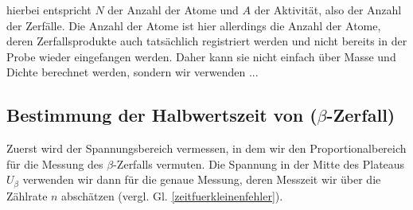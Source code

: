 hierbei entspricht $N$ der Anzahl der Atome und $A$ der Aktivität, also der Anzahl der Zerfälle. Die Anzahl der Atome ist hier allerdings die Anzahl der Atome, deren Zerfallsprodukte auch tatsächlich registriert werden und nicht bereits in der Probe wieder eingefangen werden. Daher kann sie nicht einfach über Masse und Dichte berechnet werden, sondern wir verwenden ...

\subsection{Bestimmung der Halbwertszeit von  ($\beta$-Zerfall)}
Zuerst wird der Spannungsbereich vermessen, in dem wir den Proportionalbereich für die Messung des $\beta$-Zerfalls vermuten. Die Spannung in der Mitte des Plateaus $U_{\beta}$ verwenden wir dann für die genaue Messung, deren Messzeit wir über die Zählrate $n$ abschätzen (vergl. Gl. \ref{zeitfuerkleinenfehler}).